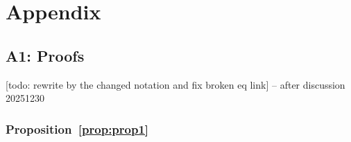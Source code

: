 \documentclass[11pt,a4paper]{article}
\begin{document}

\newpage 
\section*{Appendix}
\subsection*{A1: Proofs}

[todo: rewrite by the changed notation and fix broken eq link] -- after discussion 20251230

\subsubsection*{Proposition~\ref{prop:prop1}}
\end{document}
